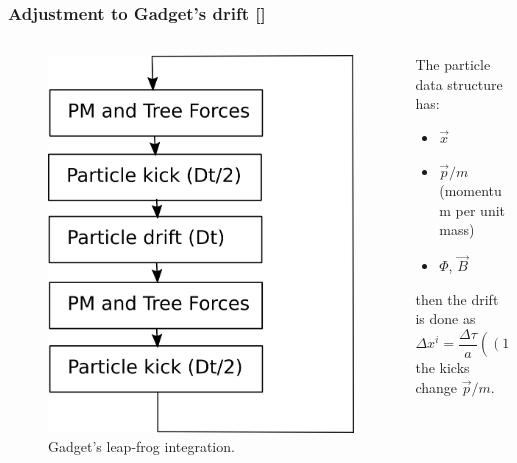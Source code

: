 \documentclass{beamer}
\makeatletter
\newcommand{\mylabel}{%
   [\beamer@againname]}
\makeatother
\begin{document}
\begin{frame}[label=drift1]
    \frametitle{Adjustment to Gadget's drift\mylabel}
\begin{columns}
    \begin{column}{0.5\textwidth}
    \begin{figure}
        \centering
        \includegraphics[height=.8\textheight]{images/leap-frog.png}
        \caption{Gadget's leap-frog integration.}
    \end{figure}
    \end{column}
    \begin{column}{0.5\textwidth}
    The particle data structure has:
    \begin{itemize}
        \item $\vec x$
        \item $\vec p/m$ (momentum per unit mass)
        \item $\Phi$, $\vec B$
    \end{itemize}
    then the drift is done as
    \[
        \Delta x^i
        = \frac{\Delta\tau}{a}((1+3\Phi)p^i/m + c B^i a )
    \]
    the kicks change $\vec p/m$.
    \end{column}
\end{columns}
\end{frame}
\end{document}
